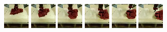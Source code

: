 \documentclass{article}
\begin{document}
\begin{figure}
\begin{subfigure}[b]{0.49\textwidth}
        \includegraphics[width=0.14\linewidth]{img/real_env_rollout_novel/1/0.png}
        \includegraphics[width=0.14\linewidth]{img/real_env_rollout_novel/1/1.png}
        \includegraphics[width=0.14\linewidth]{img/real_env_rollout_novel/1/2.png}
        \includegraphics[width=0.14\linewidth]{img/real_env_rollout_novel/1/3.png}
        \includegraphics[width=0.14\linewidth]{img/real_env_rollout_novel/1/4.png}
        \hspace{0.01\linewidth}
        \includegraphics[width=0.14\linewidth]{img/real_env_rollout_novel/1/goal.png}


\end{subfigure}
\end{figure}
\end{document}
